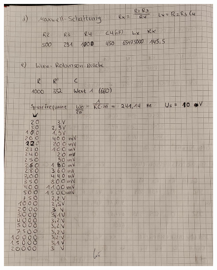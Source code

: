  \begin{figure}[H]
    \centering
     \includegraphics[scale=0.3]{Abbildungen/Kladde2.jpeg}
 \end{figure}
 \pagebreak